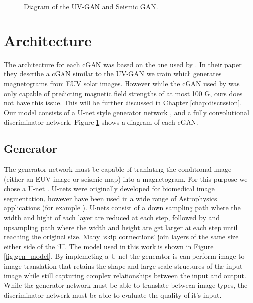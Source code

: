 \documentclass[11pt,a4paper,onecolumn]{report}
\begin{document}
\begin{figure}
  \centering
  \caption{Diagram of the UV-GAN and Seismic GAN.}
  \label{fig:solar_gans_diagram}
\end{figure}

%
%
%
%
%
\section{Architecture}
%
%
%
%
%
%

The architecture for each cGAN was based on the one used by \citet{Kim2019}. In
their paper they describe a cGAN similar to the UV-GAN we train which generates
magnetograms from EUV solar images. However while the cGAN used by
\citet{Kim2019} was only capable of predicting magnetic field strengths of at
most 100 G, ours does not have this issue. This will be further discussed in
Chapter \ref{chap:discussion}. Our model consists of a U-net style generator network
\citep{ronneberger_u-net_2015}, and a fully convolutional discriminator network. Figure
\ref{fig:solar_gans_diagram} shows a diagram of each cGAN.


\subsection{Generator}
The generator network must be capable of tranlating the conditional image
(either an EUV image or seismic map) into a magnetogram. For this purpose we
chose a U-net \citep{ronneberger_u-net_2015}. U-nets were originally developed
for biomedical image segmentation, however have been used in a wide range of
Astrophysics applications (for example
\citet{felipe_improved_2019,bekki_quantifying_2021,baso_solar_2019}). U-nets
consist of a down sampling path where the width and hight of each layer are
reduced at each step, followed by and upsampling path where the width and height
are get larger at each step until reaching the original size. Many `skip
connections' join layers of the same size either side of the `U'. The model used
in this work is shown in Figure \ref{fig:gen_model}. By implemeting a U-net the
generator is can perform image-to-image translation that retains the shape and
large scale structures of the input image while still capturing complex
relationships between the input and output. While the generator network must be
able to translate between image types, the discriminator network must be able to
evaluate the quality of it's input.
\end{document}
